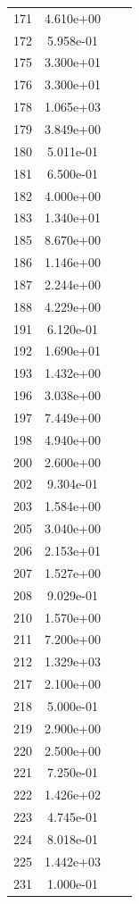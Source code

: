\documentclass[12pt]{article}
\begin{document}
\begin{longtable}{@{}cccc@{}}
171 & 4.610e+00 &  &  \\
172 & 5.958e-01 &  &  \\
175 & 3.300e+01 &  &  \\
176 & 3.300e+01 &  &  \\
178 & 1.065e+03 &  &  \\
179 & 3.849e+00 &  &  \\
180 & 5.011e-01 &  &  \\
181 & 6.500e-01 &  &  \\
182 & 4.000e+00 &  &  \\
183 & 1.340e+01 &  &  \\
185 & 8.670e+00 &  &  \\
186 & 1.146e+00 &  &  \\
187 & 2.244e+00 &  &  \\
188 & 4.229e+00 &  &  \\
191 & 6.120e-01 &  &  \\
192 & 1.690e+01 &  &  \\
193 & 1.432e+00 &  &  \\
196 & 3.038e+00 &  &  \\
197 & 7.449e+00 &  &  \\
198 & 4.940e+00 &  &  \\
200 & 2.600e+00 &  &  \\
202 & 9.304e-01 &  &  \\
203 & 1.584e+00 &  &  \\
205 & 3.040e+00 &  &  \\
206 & 2.153e+01 &  &  \\
207 & 1.527e+00 &  &  \\
208 & 9.029e-01 &  &  \\
210 & 1.570e+00 &  &  \\
211 & 7.200e+00 &  &  \\
212 & 1.329e+03 &  &  \\
217 & 2.100e+00 &  &  \\
218 & 5.000e-01 &  &  \\
219 & 2.900e+00 &  &  \\
220 & 2.500e+00 &  &  \\
221 & 7.250e-01 &  &  \\
222 & 1.426e+02 &  &  \\
223 & 4.745e-01 &  &  \\
224 & 8.018e-01 &  &  \\
225 & 1.442e+03 &  &  \\
231 & 1.000e-01 &  &  \\

\bottomrule
\end{longtable}
\end{document}
